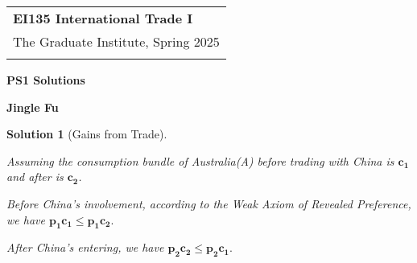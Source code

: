 \documentclass[a4paper,12pt]{article} %
\theoremstyle{nonitalic}
\newtheorem{solution}{Solution}
\begin{document}
\thispagestyle{empty} %

\begin{tabular}{p{15.5cm}} %
{\large \bf EI135 International Trade I} \\
The Graduate Institute, Spring 2025\\
\hline %
\\
\end{tabular} %

\vspace*{0.3cm} %

\begin{center} %
	{\Large \bf PS1 Solutions} %
	\vspace{2mm}
	
	{\bf Jingle Fu} %
		
\end{center}  

\vspace{0.4cm}

\begin{solution}[Gains from Trade]
    \

    Assuming the consumption bundle of Australia(A) before trading with China is $\mathbf{c_1}$ and after is $\mathbf{c_2}$.

    Before China's involvement, according to the Weak Axiom of Revealed Preference, we have $\mathbf{p_1} \mathbf{c_1} \leq \mathbf{p_1} \mathbf{c_2}.$

    After China's entering, we have $\mathbf{p_2} \mathbf{c_2} \leq \mathbf{p_2} \mathbf{c_1}.$
\end{solution}
\end{document}
